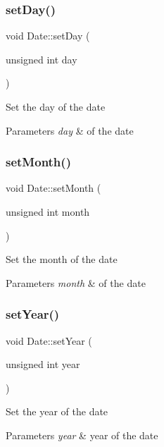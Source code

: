 \subsubsection{\texorpdfstring{set\+Day()}{setDay()}}
{\footnotesize\ttfamily void Date\+::set\+Day (\begin{DoxyParamCaption}\item[{unsigned int}]{day }\end{DoxyParamCaption})}

Set the day of the date 
\begin{DoxyParams}{Parameters}
{\em day} & of the date \\
\hline
\end{DoxyParams}
\hypertarget{classDate_aa83b79359070012ab58ff99abeb34340}{}\label{classDate_aa83b79359070012ab58ff99abeb34340} 
\subsubsection{\texorpdfstring{set\+Month()}{setMonth()}}
{\footnotesize\ttfamily void Date\+::set\+Month (\begin{DoxyParamCaption}\item[{unsigned int}]{month }\end{DoxyParamCaption})}

Set the month of the date 
\begin{DoxyParams}{Parameters}
{\em month} & of the date \\
\hline
\end{DoxyParams}
\hypertarget{classDate_a1299c7e1f0080304f082a9225a743957}{}\label{classDate_a1299c7e1f0080304f082a9225a743957} 
\subsubsection{\texorpdfstring{set\+Year()}{setYear()}}
{\footnotesize\ttfamily void Date\+::set\+Year (\begin{DoxyParamCaption}\item[{unsigned int}]{year }\end{DoxyParamCaption})}

Set the year of the date 
\begin{DoxyParams}{Parameters}
{\em year} & year of the date \\
\hline
\end{DoxyParams}
\hypertarget{classDate_addaed921af229dffeb35ef7ef30bff29}{}\label{classDate_addaed921af229dffeb35ef7ef30bff29} 
